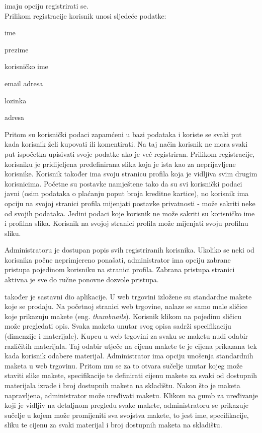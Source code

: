 		 imaju opciju registrirati se. \\Prilikom registracije korisnik unosi sljedeće podatke:
		\begin{packed_item}
			
			\item  ime
			\item  prezime
			\item  korisničko ime
			\item  email adresa
			\item  lozinka
			\item  adresa
			
		\end{packed_item}
		 Pritom su korisnički podaci zapamćeni u bazi podataka i koriste se svaki put kada korisnik želi kupovati ili komentirati. Na taj način korisnik ne mora svaki put ispočetka upisivati svoje podatke ako je već registriran. Prilikom registracije, korisniku je pridijeljena predefinirana slika koja je ista kao za neprijavljene korisnike. Korisnik također ima svoju stranicu profila koja je vidljiva svim drugim korisnicima. Početne su postavke namještene tako da su svi korisnički podaci javni (osim podataka o plaćanju poput broja kreditne kartice), no korisnik ima opciju na svojoj stranici profila mijenjati postavke privatnosti - može sakriti neke od svojih podataka. Jedini podaci koje korisnik ne može sakriti su korisničko ime i profilna slika. Korisnik na svojoj stranici profila može mijenjati svoju profilnu sliku.
		 
		 Administratoru je dostupan popis svih registriranih korisnika. Ukoliko se neki od korisnika počne neprimjereno ponašati, administrator ima opciju zabrane pristupa pojedinom korisniku na stranici profila. Zabrana pristupa stranici aktivna je sve do ručne ponovne dozvole pristupa. 
		
		 također je sastavni dio aplikacije. U web trgovini izložene su standardne makete koje se prodaju. Na početnoj stranici web trgovine, nalaze se samo male sličice koje prikazuju makete (eng. \textit{thumbnails}). Korisnik klikom na pojedinu sličicu može pregledati opis. Svaka maketa unutar svog opisa sadrži specifikaciju (dimenzije i materijale). Kupcu u web trgovini za svaku se maketu nudi odabir različitih materijala. Taj odabir utječe na cijenu makete te je cijena prikazana tek kada korisnik odabere materijal. Administrator ima opciju unošenja standardnih maketa u web trgovinu. Pritom mu se za to otvara sučelje unutar kojeg može staviti slike makete, specifikacije te definirati cijenu makete za svaki od dostupnih materijala izrade i broj dostupnih maketa na skladištu. Nakon što je maketa napravljena, administrator može uređivati maketu. Klikom na gumb za uređivanje koji je vidljiv na detaljnom pregledu svake makete, administratoru se prikazuje sučelje u kojem može promijeniti sva svojstva makete, to jest ime, specifikacije, sliku te cijenu za svaki materijal i broj dostupnih maketa na skladištu.
		
